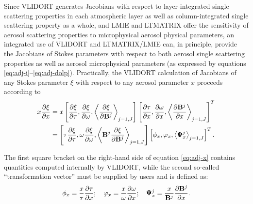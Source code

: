 Since VLIDORT generates Jacobians with respect to layer-integrated
single scattering properties in each atmospheric layer as well as
column-integrated single scattering property as a whole, and LMIE and
LTMATRIX offer the sensitivity of aerosol scattering properties to
microphysical aerosol physical parameters, an integrated use of VLIDORT
and LTMATRIX/LMIE can, in principle, provide the Jacobians of Stokes
parameters with respect to both aerosol single scattering properties as
well as aerosol microphysical parameters (as expressed by equations
\eqref{eq:adj-i}--\eqref{eq:adj-dolp}). Practically, the VLIDORT
calculation of Jacobians of any Stokes parameter $\xi$ with respect to 
any aerosol parameter $x$ proceeds according to
\begin{equation}
\begin{split}
x\frac{\partial\xi}{\partial x} &=
  x\left[ \frac{\partial\xi}{\partial\tau}, \frac{\partial\xi}{\partial\omega}, 
          \left< \frac{\partial\xi}{\partial\mathbf{B}^j}\right>_{j=1,J}\right] 
  \left[ \frac{\partial\tau}{\partial x}, \frac{\partial\omega}{\partial x}, 
         \left< \frac{\partial\mathbf{B}^j}{\partial x}\right>_{j=1,J}\right]^T \\
  &= \left[ \tau \frac{\partial\xi}{\partial\tau}, \omega \frac{\partial\xi}{\partial\omega}, 
          \left< \mathbf{B}^j \frac{\partial\xi}{\partial\mathbf{B}^j}\right>_{j=1,J}\right]
     \left[ \phi_x, \varphi_x, \left< \pmb{\Psi}_x^j\right>_{j=1,J}
\right]^T. 
\end{split}
\label{eq:adj-x}
\end{equation}

The first square bracket on the right-hand side of equation
\eqref{eq:adj-x} contains quantities computed internally by VLIDORT, 
while the second so-called “transformation vector” must be supplied 
by users and is defined as:
\begin{equation}
\phi_x = \frac{x}{\tau}\frac{\partial\tau}{\partial x}; \quad 
\varphi_x = \frac{x}{\omega}\frac{\partial\omega}{\partial x}; \quad 
\pmb{\Psi}_x^j = \frac{x}{\mathbf{B}^j}\frac{\partial\mathbf{B}^j}{\partial x}.
\end{equation}

